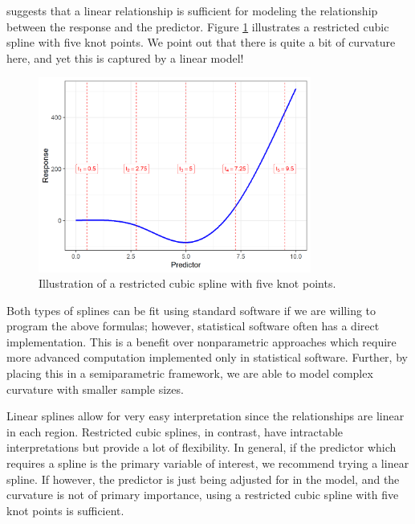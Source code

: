 \documentclass[
]{book}
\theoremstyle{plain}
\theoremstyle{mydefn}
\theoremstyle{myexmpl}
\theoremstyle{remark}
\begin{document}
suggests that a linear relationship is sufficient for modeling the relationship between the response and the predictor. Figure \ref{fig:glm-splines-restricted-cubic-spline} illustrates a restricted cubic spline with five knot points. We point out that there is quite a bit of curvature here, and yet this is captured by a linear model!

\begin{figure}

{\centering \includegraphics[width=0.8\textwidth]{./Images/glm-splines-restricted-cubic-spline-1} 

}

\caption{Illustration of a restricted cubic spline with five knot points.}\label{fig:glm-splines-restricted-cubic-spline}
\end{figure}

Both types of splines can be fit using standard software if we are willing to program the above formulas; however, statistical software often has a direct implementation. This is a benefit over nonparametric approaches which require more advanced computation implemented only in statistical software. Further, by placing this in a semiparametric framework, we are able to model complex curvature with smaller sample sizes.

Linear splines allow for very easy interpretation since the relationships are linear in each region. Restricted cubic splines, in contrast, have intractable interpretations but provide a lot of flexibility. In general, if the predictor which requires a spline is the primary variable of interest, we recommend trying a linear spline. If however, the predictor is just being adjusted for in the model, and the curvature is not of primary importance, using a restricted cubic spline with five knot points is sufficient.
\end{document}
